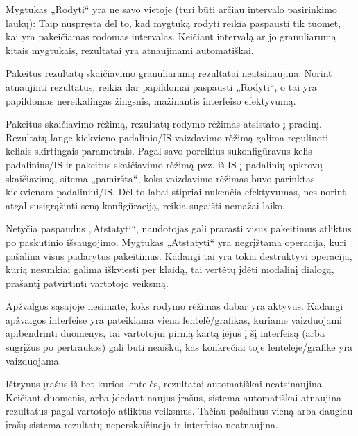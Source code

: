 {
  Mygtukas „Rodyti“ yra ne savo vietoje (turi būti arčiau intervalo
  pasirinkimo laukų):
}
{
  Taip nuspręsta dėl to, kad mygtuką rodyti reikia paspausti tik tuomet, kai yra
  pakeičiamas rodomas intervalas. Keičiant intervalą ar jo granuliarumą kitais mygtukais,
  rezultatai yra atnaujinami automatiškai.
}

{
  Pakeitus rezultatų skaičiavimo granuliarumą rezultatai neatsinaujina.
}
{
  Norint atnaujinti rezultatus, reikia dar papildomai paspausti „Rodyti“, o tai yra papildomas
  nereikalingas žingsnis, mažinantis interfeiso efektyvumą.
}

{
  Pakeitus skaičiavimo rėžimą, rezultatų rodymo rėžimas atsistato į pradinį.
}
{
  Rezultatų lange kiekvieno padalinio/IS vaizdavimo rėžimą galima reguliuoti keliais skirtingais
  parametrais. Pagal savo poreikius sukonfigūravus kelis padalinius/IS ir pakeitus skaičiavimo rėžimą pvz. iš IS į padalinių apkrovų skaičiavimą, sitema „pamiršta“, koks vaizdavimo rėžimas
  buvo parinktas kiekvienam padaliniui/IS. Dėl to labai stipriai nukenčia efektyvumas, nes norint
  atgal susigrąžinti seną konfigūraciją, reikia sugaišti nemažai laiko.
}

{
  Netyčia paspaudus „Atstatyti“, naudotojas gali prarasti visus pakeitimus
  atliktus po paskutinio išsaugojimo.
}
{
  Mygtukas „Atstatyti“ yra negrįžtama operacija, kuri pašalina visus padarytus pakeitimus.
  Kadangi tai yra tokia destruktyvi operacija, kurią nesunkiai galima iškviesti per klaidą,
  tai vertėtų įdėti modalinį dialogą, prašantį patvirtinti vartotojo veiksmą.
}

{
  Apžvalgos sąsajoje nesimatė, koks rodymo rėžimas dabar yra aktyvus.
}
{
  Kadangi apžvalgos interfeise yra pateikiama viena lentelė/grafikas, kuriame vaizduojami
  apibendrinti duomenys, tai vartotojui pirmą kartą įėjus į šį interfeisą (arba sugrįžus po
  pertraukos) gali būti neaišku, kas konkrečiai toje lentelėje/grafike yra vaizduojama.
}

{
  Ištrynus įrašus iš bet kurios lentelės, rezultatai automatiškai neatsinaujina.
}
{
  Keičiant duomenis, arba įdedant naujus įrašus, sistema automatiškai atnaujina rezultatus
  pagal vartotojo atliktus veiksmus. Tačiau pašalinus vieną arba daugiau įrašų sistema
  rezultatų neperskaičiuoja ir interfeiso neatnaujina.
}
